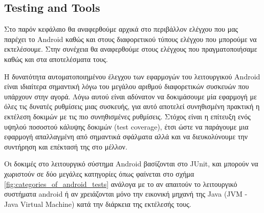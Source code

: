 %

	\subsection{Testing and Tools}
	Στο παρόν κεφάλαιο θα αναφερθούμε αρχικά στο περιβάλλον ελέγχου που μας παρέχει το Android καθώς και στους διαφορετικού τύπους ελέγχου που μπορούμε να εκτελέσουμε. Στην συνέχεια θα αναφερθούμε στους ελέγχους που πραγματοποιήσαμε καθώς και στα αποτελέσματα τους.
	
	Η δυνατότητα αυτοματοποιημένου έλεγχου των εφαρμογών του λειτουργικού Android είναι ιδιαίτερα σημαντική λόγω του μεγάλου αριθμού διαφορετικών συσκευών που υπάρχουν στην αγορά. Λόγω αυτού είναι αδύνατον να δοκιμάσουμε μία εφαρμογή με όλες τις δυνατές ρυθμίσεις μιας συσκευής, για αυτό αποτελεί συνηθισμένη πρακτική η εκτέλεση δοκιμών με τις πιο συνηθισμένες ρυθμίσεις. Στόχος είναι η επίτευξη ενός υψηλού ποσοστού κάλυψης δοκιμών (test coverage), έτσι ώστε να παράγουμε μια εφαρμογή απαλλαγμένη από σημαντικά σφάλματα αλλά και να διευκολύνουμε την συντήρηση και επέκτασή της στο μέλλον.
	
	Οι δοκιμές στο λειτουργικό σύστημα Android βασίζονται στο JUnit, και μπορούν να χωριστούν σε δύο μεγάλες κατηγορίες όπως φαίνεται στο σχήμα \ref{fig:categories_of_android_tests} ανάλογα με το αν απαιτούν το λειτουργικό συστήματα android ή αν χρειάζονται μόνο την εικονική μηχανή της Java (JVM - Java Virtual Machine) κατά την διάρκεια της εκτέλεσής τους\cite{androidTesting}.
	
